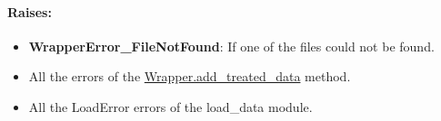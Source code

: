 \paragraph{Raises:}
\begin{itemize}
    \item \textbf{WrapperError\_FileNotFound}: If one of the files could not be found.
    \item All the errors of the \hyperref[subchapter:wrapper.add_treated_data]{Wrapper.add\_treated\_data} method.
    \item All the LoadError errors of the load\_data module.
\end{itemize}



